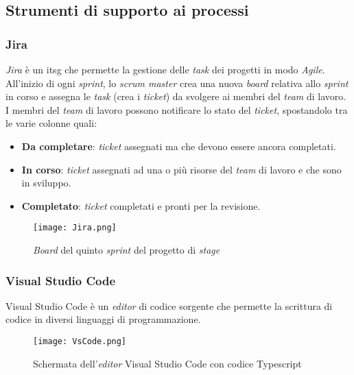\subsection{Strumenti di supporto ai processi}
\subsubsection{Jira}
\textit{Jira} è un \gls{itsg} che permette la gestione delle \textit{task} dei progetti in modo \textit{Agile}. All'inizio di ogni \textit{sprint}, lo \textit{scrum master} crea una nuova \textit{board} relativa allo \textit{sprint} in corso e assegna le \textit{task} (crea i \textit{ticket}) da svolgere ai membri del \textit{team} di lavoro.
I membri del \textit{team} di lavoro possono notificare lo stato del \textit{ticket}, spostandolo tra le varie colonne quali: 
\begin{itemize}
    \item \textbf{Da completare}: \textit{ticket} assegnati ma che devono essere ancora completati.
    \item \textbf{In corso}: \textit{ticket} assegnati ad una o più risorse del \textit{team} di lavoro e che sono in sviluppo.
    \item \textbf{Completato}: \textit{ticket} completati e pronti per la revisione.
\end{itemize}
\begin{figure}[H]
    \centering
    \texttt{[image: Jira.png]}
    \caption{\textit{Board} del quinto \textit{sprint} del progetto di \textit{stage}}
    \label{fig:Jira}
\end{figure}
\subsubsection{Visual Studio Code}
Visual Studio Code è un \textit{editor} di codice sorgente che permette la scrittura di codice in diversi linguaggi di programmazione.
\begin{figure}[H]
    \centering
    \texttt{[image: VsCode.png]}
    \caption{Schermata dell'\textit{editor} Visual Studio Code con codice Typescript}
    \label{fig:VsCode}
\end{figure}
